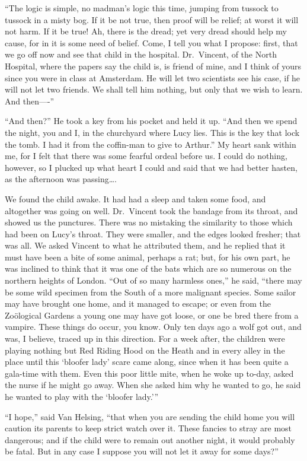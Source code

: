 \documentclass[12pt,openright]{book}
\begin{document}
“The logic is simple, no madman’s logic this time, jumping from tussock to tussock in a misty bog. If it be not true, then proof will be relief; at worst it will not harm. If it be true! Ah, there is the dread; yet very dread should help my cause, for in it is some need of belief. Come, I tell you what I propose: first, that we go off now and see that child in the hospital. Dr. Vincent, of the North Hospital, where the papers say the child is, is friend of mine, and I think of yours since you were in class at Amsterdam. He will let two scientists see his case, if he will not let two friends. We shall tell him nothing, but only that we wish to learn. And then—-”

“And then?” He took a key from his pocket and held it up. “And then we spend the night, you and I, in the churchyard where Lucy lies. This is the key that lock the tomb. I had it from the coffin-man to give to Arthur.” My heart sank within me, for I felt that there was some fearful ordeal before us. I could do nothing, however, so I plucked up what heart I could and said that we had better hasten, as the afternoon was passing….

We found the child awake. It had had a sleep and taken some food, and altogether was going on well. Dr. Vincent took the bandage from its throat, and showed us the punctures. There was no mistaking the similarity to those which had been on Lucy’s throat. They were smaller, and the edges looked fresher; that was all. We asked Vincent to what he attributed them, and he replied that it must have been a bite of some animal, perhaps a rat; but, for his own part, he was inclined to think that it was one of the bats which are so numerous on the northern heights of London. “Out of so many harmless ones,” he said, “there may be some wild specimen from the South of a more malignant species. Some sailor may have brought one home, and it managed to escape; or even from the Zoölogical Gardens a young one may have got loose, or one be bred there from a vampire. These things do occur, you know. Only ten days ago a wolf got out, and was, I believe, traced up in this direction. For a week after, the children were playing nothing but Red Riding Hood on the Heath and in every alley in the place until this ‘bloofer lady’ scare came along, since when it has been quite a gala-time with them. Even this poor little mite, when he woke up to-day, asked the nurse if he might go away. When she asked him why he wanted to go, he said he wanted to play with the ‘bloofer lady.’”

“I hope,” said Van Helsing, “that when you are sending the child home you will caution its parents to keep strict watch over it. These fancies to stray are most dangerous; and if the child were to remain out another night, it would probably be fatal. But in any case I suppose you will not let it away for some days?”
\end{document}
